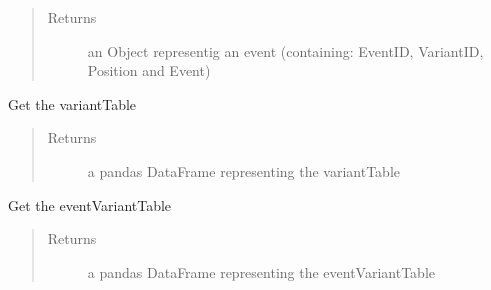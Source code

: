 \documentclass[letterpaper,10pt,english]{sphinxmanual}
\begin{document}
\begin{fulllineitems}
\begin{fulllineitems}
\begin{quote}
\begin{description}
\item[{Returns}] \leavevmode
an Object representig an event (containing:  EventID, VariantID, Position and Event)

\end{description}\end{quote}

\end{fulllineitems}


\begin{fulllineitems}
\label{\detokenize{preprocessing:eventLogProcessing.DBTool.DBTool.getVariantTable}}
Get the variantTable
\begin{quote}\begin{description}
\item[{Returns}] \leavevmode
a pandas DataFrame representing the variantTable

\end{description}\end{quote}

\end{fulllineitems}


\begin{fulllineitems}
\label{\detokenize{preprocessing:eventLogProcessing.DBTool.DBTool.getEventVariantTable}}
Get the eventVariantTable
\begin{quote}\begin{description}
\item[{Returns}] \leavevmode
a pandas DataFrame representing the eventVariantTable

\end{description}\end{quote}

\end{fulllineitems}


\end{fulllineitems}


\begin{DUlineblock}{0em}
\item[] 
\end{DUlineblock}
\end{document}

